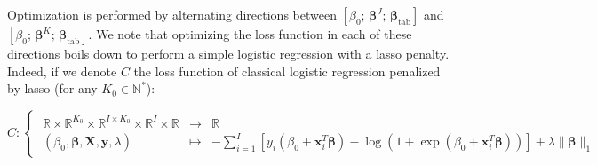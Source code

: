 \documentclass[preprint,12pt]{elsarticle}
\begin{document}
\noindent Optimization is performed by alternating directions between $\left[ \beta_0 ;\, \bm{\beta}^J  ; \,  \bm{\beta}_{\text{tab}}   \right]$ and  $\left[ \beta_0; \, \bm{\beta}^K  ;\, \bm{\beta}_{\text{tab}}  \right]$.  We note that optimizing the loss function in each of these directions boils down to perform a simple logistic regression with a lasso penalty. Indeed, if we denote $C$ the loss function of classical logistic regression penalized by lasso (for any $K_0 \in \mathbb{N}^{*}$):


\begin{equation}
    C: \begin{cases}
        \begin{array}{ccl}
            \mathbb{R} \times \mathbb{R}^{K_0} \times \mathbb{R}^{I \times K_0} \times \mathbb{R}^{I} \times \mathbb{R} & \longrightarrow & \mathbb{R}                                                                                                                                                                    \\
            (\beta_0, \bm{\beta}, \mathbf{X}, \mathbf{y}, \lambda )                                                     & \longmapsto     & -\displaystyle{\sum\limits_{i = 1}^I} [ y_i(\beta_0 + \mathbf{x}_i^T \bm{\beta}) - \log(1 + \exp(\beta_0 + \mathbf{x}_i^T \bm{\beta})) ] + \lambda \lVert \bm{\beta} \rVert_1
        \end{array}
    \end{cases}
\end{equation}
\end{document}

